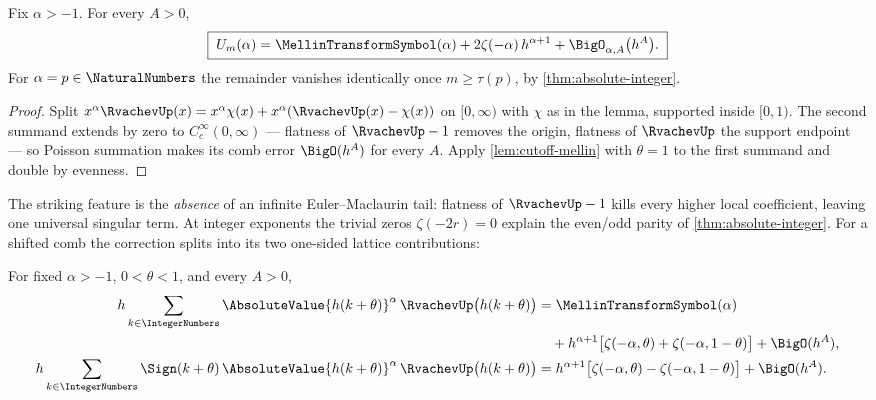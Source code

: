 \begin{theorem}
\label{thm:fractional-zeta}
Fix $\alpha>-1$.  For every $A>0$,
\begin{equation}
 \boxed{\;
 U_m(\alpha)
 =\MellinTransformSymbol(\alpha)
 +2\zeta(-\alpha)\,h^{\alpha+1}
 +\BigO_{\alpha,A}\bigl(h^{A}\bigr).
 \;}
 \label{eq:fractional-zeta}
\end{equation}
For $\alpha=p\in\NaturalNumbers$ the remainder vanishes identically once
$m\ge\tau(p)$, by \cref{thm:absolute-integer}.
\end{theorem}

\begin{proof}
Split $x^{\alpha}\RvachevUp(x)=x^{\alpha}\chi(x)
+x^{\alpha}(\RvachevUp(x)-\chi(x))$ on $[0,\infty)$ with $\chi$ as in the
lemma, supported inside $[0,1)$.  The second summand extends by zero
to $C_c^\infty(0,\infty)$ --- flatness of $\RvachevUp-1$ removes the origin,
flatness of $\RvachevUp$ the support endpoint --- so Poisson summation makes
its comb error $\BigO(h^{A})$ for every $A$.  Apply
\cref{lem:cutoff-mellin} with $\theta=1$ to the first summand and
double by evenness.
\end{proof}

The striking feature is the \emph{absence} of an infinite
Euler--Maclaurin tail: flatness of $\RvachevUp-1$ kills every higher local
coefficient, leaving one universal singular term.  At integer
exponents the trivial zeros $\zeta(-2r)=0$ explain the even/odd parity
of \cref{thm:absolute-integer}.  For a shifted comb the correction
splits into its two one-sided lattice contributions:

\begin{theorem}
\label{thm:shifted-Hurwitz}
For fixed $\alpha>-1$, $0<\theta<1$, and every $A>0$,
\begin{align}
 h\sum_{k\in\IntegerNumbers}\AbsoluteValue{h(k+\theta)}^{\alpha}\,
 \RvachevUp\bigl(h(k+\theta)\bigr)
 &=\MellinTransformSymbol(\alpha)\notag\\
 &\quad+h^{\alpha+1}
   \bigl[\zeta(-\alpha,\theta)+\zeta(-\alpha,1-\theta)\bigr]
   +\BigO(h^{A}),
 \label{eq:shifted-abs-Hurwitz}\\
 h\sum_{k\in\IntegerNumbers}\Sign(k+\theta)\,\AbsoluteValue{h(k+\theta)}^{\alpha}\,
 \RvachevUp\bigl(h(k+\theta)\bigr)
 &=h^{\alpha+1}
   \bigl[\zeta(-\alpha,\theta)-\zeta(-\alpha,1-\theta)\bigr]
   +\BigO(h^{A}).
 \label{eq:shifted-signed-Hurwitz}
\end{align}
\end{theorem}

